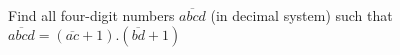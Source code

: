 Find all four-digit numbers $\overline{abcd}$ (in decimal system) such that $\overline{abcd}= (\overline{ac}+1).(\overline{bd} +1)$